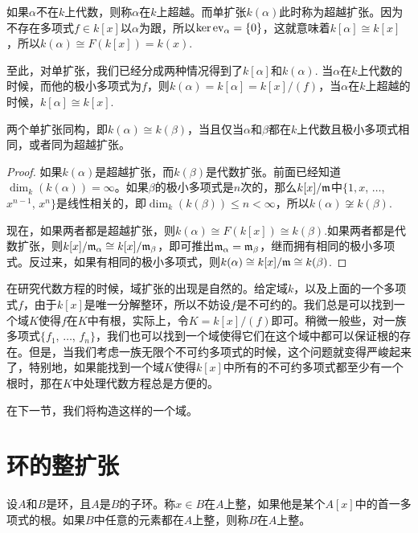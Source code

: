 \para 如果$\alpha$不在$k$上代数，则称$\alpha$在$k$上超越。而单扩张$k(\alpha)$此时称为超越扩张。因为不存在多项式$f\in k[x]$以$\alpha$为跟，所以$\ker \operatorname{ev}_\alpha=\{0\}$，这就意味着$k[\alpha]\cong k[x]$，所以$k(\alpha)\cong F(k[x])=k(x)$.

至此，对单扩张，我们已经分成两种情况得到了$k[\alpha]$和$k(\alpha)$. 当$\alpha$在$k$上代数的时候，而他的极小多项式为$f$，则$k(\alpha)=k[\alpha]=k[x]/(f)$，当$\alpha$在$k$上超越的时候，$k[\alpha]\cong k[x]$.

\begin{pro}
两个单扩张同构，即$k(\alpha)\cong k(\beta)$，当且仅当$\alpha$和$\beta$都在$k$上代数且极小多项式相同，或者同为超越扩张。
\end{pro}

\begin{proof} 
	如果$k(\alpha)$是超越扩张，而$k(\beta)$是代数扩张。前面已经知道$\dim_k(k(\alpha))=\infty$。如果$\beta$的极小多项式是$n$次的，那么$k[x]/\mathfrak{m}$中$\{1,x$, $\dots$, $x^{n-1}$, $x^n\}$是线性相关的，即$\dim_k(k(\beta))\leq n<\infty$，所以$k(\alpha)\not\cong k(\beta)$.

	现在，如果两者都是超越扩张，则$k(\alpha)\cong F(k[x])\cong k(\beta)$.如果两者都是代数扩张，则$k[x]/\mathfrak{m}_\alpha\cong k[x]/\mathfrak{m}_\beta$，即可推出$\mathfrak{m}_\alpha=\mathfrak{m}_\beta$，继而拥有相同的极小多项式。反过来，如果有相同的极小多项式，则$k(\alpha)\cong k[x]/\mathfrak{m}\cong k(\beta)$.
\end{proof}

\begin{para}
	在研究代数方程的时候，域扩张的出现是自然的。给定域$k$，以及上面的一个多项式$f$，由于$k[x]$是唯一分解整环，所以不妨设$f$是不可约的。我们总是可以找到一个域$K$使得$f$在$K$中有根，实际上，令$K=k[x]/(f)$即可。稍微一般些，对一族多项式$\{f_1$, $\dots$, $f_n\}$，我们也可以找到一个域使得它们在这个域中都可以保证根的存在。但是，当我们考虑一族无限个不可约多项式的时候，这个问题就变得严峻起来了，特别地，如果能找到一个域$K$使得$k[x]$中所有的不可约多项式都至少有一个根时，那在$K$中处理代数方程总是方便的。
\end{para}

在下一节，我们将构造这样的一个域。

\section{环的整扩张}

\para 设$A$和$B$是环，且$A$是$B$的子环。称$x\in B$在$A$上整，如果他是某个$A[x]$中的首一多项式的根。如果$B$中任意的元素都在$A$上整，则称$B$在$A$上整。

